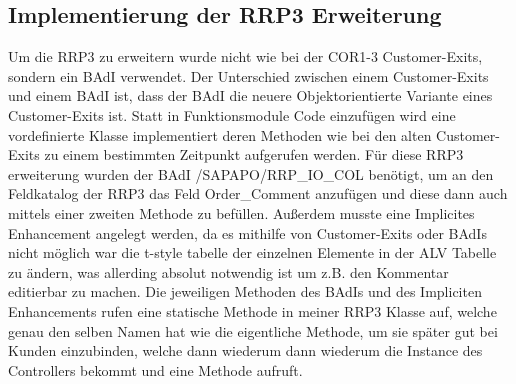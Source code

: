 \subsection{Implementierung der RRP3 Erweiterung}
\label{sec:Implementierung der RRP3 Erweiterung}   
Um die RRP3 zu erweitern wurde nicht wie bei der COR1-3 Customer-Exits, sondern ein \ac*{BAdI} verwendet. Der Unterschied zwischen einem Customer-Exits und einem \ac*{BAdI} ist, dass der \ac*{BAdI} die neuere Objektorientierte Variante eines Customer-Exits ist. Statt in Funktionsmodule Code einzufügen wird eine vordefinierte Klasse implementiert deren Methoden wie bei den alten Customer-Exits zu einem bestimmten Zeitpunkt aufgerufen werden. Für diese RRP3 erweiterung wurden der \ac*{BAdI} /SAPAPO/RRP\_IO\_COL benötigt, um an den Feldkatalog der RRP3 das Feld Order\_Comment anzufügen und diese dann auch mittels einer zweiten Methode zu befüllen. Außerdem musste eine Implicites Enhancement angelegt werden, da es mithilfe von Customer-Exits oder \ac*{BAdI}s nicht möglich war die t-style tabelle der einzelnen Elemente in der \ac*{ALV} Tabelle zu ändern, was allerding absolut notwendig ist um z.B. den Kommentar editierbar zu machen. Die jeweiligen Methoden des \ac*{BAdI}s und des Impliciten Enhancements rufen eine statische Methode in meiner RRP3 Klasse auf, welche genau den selben Namen hat wie die eigentliche Methode, um sie später gut bei Kunden einzubinden, welche dann wiederum dann wiederum die Instance des Controllers bekommt und eine Methode aufruft.

